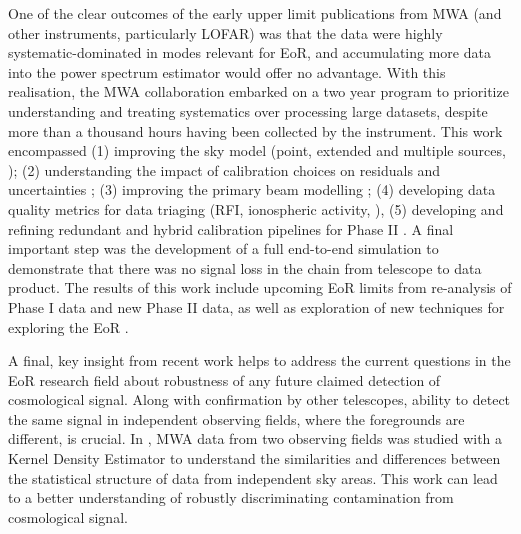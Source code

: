 One of the clear outcomes of the early upper limit publications from MWA (and other instruments, particularly LOFAR) was that the data were highly systematic-dominated in modes relevant for EoR, and accumulating more data into the power spectrum estimator would offer no advantage. With this realisation, the MWA collaboration embarked on a two year program to prioritize understanding and treating systematics over processing large datasets, despite more than a thousand hours having been collected by the instrument. This work encompassed (1) improving the sky model (point, extended and multiple sources, \cite{procopio15,trottwayth17_extended}); (2) understanding the impact of calibration choices on residuals and uncertainties \cite{barry16,trottwayth2016,trott17_skala,ewall-wice17,murray17}; (3) improving the primary beam modelling \cite{line18}; (4) developing data quality metrics for data triaging (RFI, ionospheric activity, \cite{jordan16,trott18,wilensky19}), (5) developing and refining redundant and hybrid calibration pipelines for Phase II \cite{li18_redundant,joseph18,byrne19}. A final important step was the development of a full end-to-end simulation to demonstrate that there was no signal loss in the chain from telescope to data product. The results of this work include upcoming EoR limits from re-analysis of Phase I data and new Phase II data, as well as exploration of new techniques for exploring the EoR \cite{trott19_bispectrum}.

A final, key insight from recent work helps to address the current questions in the EoR research field about robustness of any future claimed detection of cosmological signal. Along with confirmation by other telescopes, ability to detect the same signal in independent observing fields, where the foregrounds are different, is crucial. In \cite{trott19_kde}, MWA data from two observing fields was studied with a Kernel Density Estimator to understand the similarities and differences between the statistical structure of data from independent sky areas. This work can lead to a better understanding of robustly discriminating contamination from cosmological signal.


